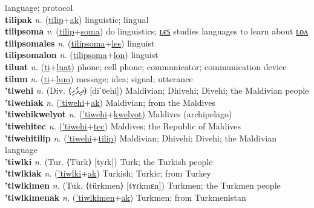 language; protocol \label{tilip} \\
\textbf{tilipak} \textit{n.} (\hyperref[tilip]{tilip}+\hyperref[ak]{ak})
linguistic; lingual \label{tilipak} \\
\textbf{tilipsoma} \textit{v.} (\hyperref[tilip]{tilip}+\hyperref[soma]{soma})
do linguistics; \hyperref[tilipsomales]{ʟєꜱ} studies languages to learn about \hyperref[tilipsomalon]{ʟᴏᴧ} \label{tilipsoma} \\
\textbf{tilipsomales} \textit{n.} (\hyperref[tilipsoma]{tilipsoma}+\hyperref[les]{les})
linguist \label{tilipsomales} \\
\textbf{tilipsomalon} \textit{n.} (\hyperref[tilipsoma]{tilipsoma}+\hyperref[lon]{lon})
linguist \label{tilipsomalon} \\
\textbf{tiluat} \textit{n.} (\hyperref[ti]{ti}+\hyperref[luat]{luat})
phone; cell phone; communicator; communication device \label{tiluat} \\
\textbf{tilum} \textit{n.} (\hyperref[ti]{ti}+\hyperref[lum]{lum})
message; idea; signal; utterance \label{tilum} \\
\textbf{'tiwehi} \textit{n.} (Div. ⟨ދިވެހި⟩ [diˈʋehi])
Maldivian; Dhivehi; Divehi; the Maldivian people \label{'tiwehi} \\
\textbf{'tiwehiak} \textit{n.} (\hyperref['tiwehi]{'tiwehi}+\hyperref[ak]{ak})
Maldivian; from the Maldives \label{'tiwehiak} \\
\textbf{'tiwehikwelyot} \textit{n.} (\hyperref['tiwehi]{'tiwehi}+\hyperref[kwelyot]{kwelyot})
Maldives (archipelago) \label{'tiwehikwelyot} \\
\textbf{'tiwehitec} \textit{n.} (\hyperref['tiwehi]{'tiwehi}+\hyperref[tec]{tec})
Maldives; the Republic of Maldives \label{'tiwehitec} \\
\textbf{'tiwehitilip} \textit{n.} (\hyperref['tiwehi]{'tiwehi}+\hyperref[tilip]{tilip})
Maldivian; Dhivehi; Divehi; the Maldivian language \label{'tiwehitilip} \\
\textbf{'tiwlki} \textit{n.} (Tur. ⟨Türk⟩ [tyɾk])
Turk; the Turkish people \label{'tiwlki} \\
\textbf{'tiwlkiak} \textit{n.} (\hyperref['tiwlki]{'tiwlki}+\hyperref[ak]{ak})
Turkish; Turkic; from Turkey \label{'tiwlkiak} \\
\textbf{'tiwlkimen} \textit{n.} (Tuk. ⟨türkmen⟩ [tʏɾkmɛn])
Turkmen; the Turkmen people \label{'tiwlkimen} \\
\textbf{'tiwlkimenak} \textit{n.} (\hyperref['tiwlkimen]{'tiwlkimen}+\hyperref[ak]{ak})
Turkmen; from Turkmenistan \label{'tiwlkimenak} \\
